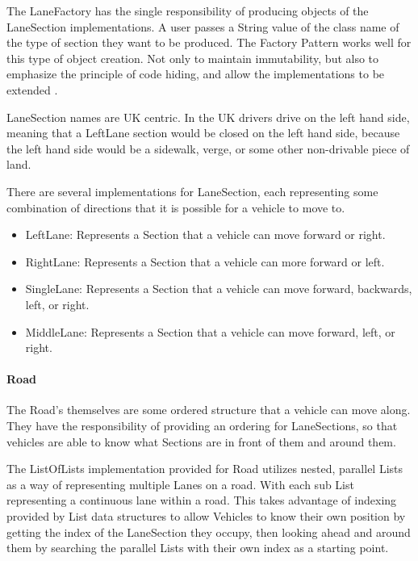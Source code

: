 \documentclass[11pt]{article}
\begin{document}
{\begin{itemize}
    The LaneFactory has the single responsibility of producing objects of the LaneSection implementations. A user passes a String value of the class name of the type of section they want to be produced. The Factory Pattern works well for this type of object creation. Not only to maintain immutability, but also to emphasize the principle of code hiding, and allow the implementations to be extended \cite{HeadFirstFreeman}.
    
    LaneSection names are UK centric. In the UK drivers drive on the left hand side, meaning that a LeftLane section would be closed on the left hand side, because the left hand side would be a sidewalk, verge, or some other non-drivable piece of land.
    
    There are several implementations for LaneSection, each representing some combination of directions that it is possible for a vehicle to move to.
    
    \begin{itemize}[noitemsep]
    \item LeftLane: Represents a Section that a vehicle can move forward or right.
    \item RightLane: Represents a Section that a vehicle can more forward or left.
    \item SingleLane: Represents a Section that a vehicle can move forward, backwards, left, or right.
    \item MiddleLane: Represents a Section that a vehicle can move forward, left, or right.
    \end{itemize}
    \paragraph{Road}
    
    The Road's themselves are some ordered structure that a vehicle can move along. They have the responsibility of providing an ordering for LaneSections, so that vehicles are able to know what Sections are in front of them and around them.
    
    The ListOfLists implementation provided for Road utilizes nested, parallel Lists as a way of representing multiple Lanes on a road. With each sub List representing a continuous lane within a road. This takes advantage of indexing provided by List data structures to allow Vehicles to know their own position by getting the index of the LaneSection they occupy, then looking ahead and around them by searching the parallel Lists with their own index as a starting point.
    

\end{itemize}}
\end{document}
